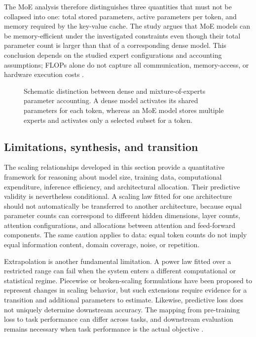 The MoE analysis therefore distinguishes three quantities that must not be
collapsed into one: total stored parameters, active parameters per token,
and memory required by the key-value cache. The study argues that MoE models
can be memory-efficient under the investigated constraints even though
their total parameter count is larger than that of a corresponding dense
model. This conclusion depends on the studied expert configurations and
accounting assumptions; FLOPs alone do not capture all communication,
memory-access, or hardware execution costs
\parencite{Ludziejewski2025JointMoE}.

\begin{figure}[htbp]
    \centering
    
    \caption{Schematic distinction between dense and mixture-of-experts
    parameter accounting. A dense model activates its shared parameters for
    each token, whereas an MoE model stores multiple experts and activates
    only a selected subset for a token.}
    \label{fig:scaling-moe}
\end{figure}

\subsection{Limitations, synthesis, and transition}
\label{subsec:scaling-limitations-transition}

The scaling relationships developed in this section provide a quantitative
framework for reasoning about model size, training data, computational
expenditure, inference efficiency, and architectural allocation. Their
predictive validity is nevertheless conditional. A scaling law fitted for
one architecture should not automatically be transferred to another
architecture, because equal parameter counts can correspond to different
hidden dimensions, layer counts, attention configurations, and allocations
between attention and feed-forward components. The same caution applies to
data: equal token counts do not imply equal information content, domain
coverage, noise, or repetition.

Extrapolation is another fundamental limitation. A power law fitted over a
restricted range can fail when the system enters a different computational
or statistical regime. Piecewise or broken-scaling formulations have been
proposed to represent changes in scaling behavior, but such extensions
require evidence for a transition and additional parameters to estimate.
Likewise, predictive loss does not uniquely determine downstream accuracy.
The mapping from pre-training loss to task performance can differ across
tasks, and downstream evaluation remains necessary when task performance
is the actual objective \parencite{Sengupta2025ScalingSurvey,
Bian2025InferenceEfficient}.

